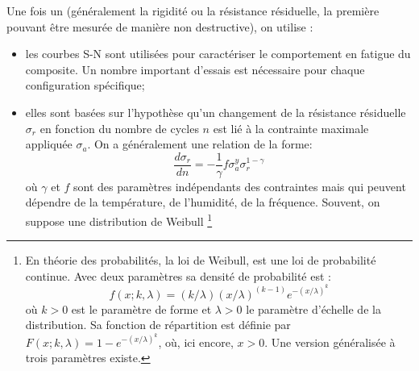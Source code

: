 Une fois un  (généralement la rigidité ou la
résistance résiduelle, la première pouvant être mesurée de manière non
destructive), on utilise :
\begin{itemize}
   \item {} les courbes S-N sont utilisées
         pour caractériser le comportement en fatigue du composite.
         Un nombre important d'essais est nécessaire pour chaque
         configuration spécifique;

   \item {}
         elles sont basées sur l'hypothèse qu'un changement de la
         résistance résiduelle $\sigma_r$ en fonction du nombre de
         cycles $n$ est lié à la contrainte maximale appliquée $\sigma_a$.
         On a généralement une relation de la forme:
         \begin{equation}
            \dfrac{d \sigma_r}{d n} = -\dfrac1\gamma f\sigma_a^y
            \sigma_r^{1-\gamma}
         \end{equation}
         où $\gamma$ et $f$ sont des paramètres indépendants des
         contraintes mais qui peuvent dépendre de la température, de
         l'humidité, de la fréquence.
         Souvent, on suppose une distribution
        de Weibull
\footnote{En théorie des probabilités, la loi de Weibull, est une loi de probabilité continue. Avec deux paramètres sa densité de probabilité est :
\begin{equation*}   f(x;k,\lambda) = (k/\lambda) (x/\lambda)^{(k-1)} e^{-(x/\lambda)^k}\end{equation*}
où $k > 0$ est le paramètre de forme et $\lambda > 0$ le paramètre
d'échelle de la distribution.
Sa fonction de répartition est définie par
$   F(x;k,\lambda) = 1- e^{-(x/\lambda)^k}$,
où, ici encore, $x > 0$.
\medskipvm
Une version généralisée  à trois paramètres existe.

}
\end{itemize}

